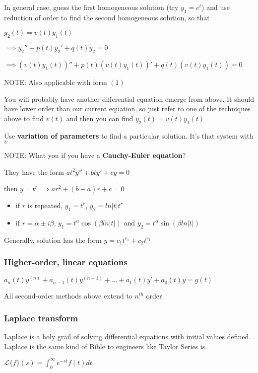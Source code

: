 \documentclass[12pt]{article}
\begin{document}
In general case, guess the first homogeneous solution (try \(y_1=e^t\)) and
use reduction of order to find the second homogeneous solution, so that

\(y_2(t) = v(t)y_1(t)\)

\(\implies y_2'' + p(t)y_2' + q(t)y_2 = 0\)

\(\implies (v(t)y_1(t))''+p(t)(v(t)y_1(t))'+q(t)(v(t)y_1(t))=0\)

NOTE: Also applicable with form \((1)\)

You will probably have another differential equation emerge from above. It
should have lower order than our current equation, so just refer to one of
the techniques above to find \(v(t)\) and then you can find
\(y_2(t)=v(t)y_1(t)\)

Use \textbf{variation of parameters} to find a particular solution. It's that
system with \(v\)

NOTE: What you if you have a \textbf{Cauchy-Euler equation}?

They have the form \(at^2y''+bty'+cy=0\)

then \(y=t^r \implies ar^2+(b-a)r+c=0\)

\begin{itemize}
\item if \(r\) is repeated, \(y_1=t^r\), \(y_2=ln|t|t^r\)
\item if \(r=\alpha\pm i\beta\), \(y_1=t^{\alpha}\cos(\beta ln|t|)\) and
\(y_2=t^{\alpha}\sin(\beta ln|t|)\)
\end{itemize}

Generally, solution has the form \(y=c_1t^{r_1}+c_2t^{r_2}\)

\subsubsection*{Higher-order, linear equations}
\label{sec:org57cd4c1}
\(a_n(t)y^{(n)}+a_{n-1}(t)y^{(n-1)}+\ldots+a_1(t)y'+a_0(t)y=g(t)\)

All second-order methods above extend to \(n^{th}\) order.

\subsubsection*{Laplace transform}
\label{sec:orgecfb79e}
Laplace is a holy grail of solving differential equations with initial
values defined. Laplace is the same kind of Bible to engineers like Taylor
Series is. 

\(\mathcal{L}\{f\}(s) = \int_0^{\infty} e^{-st} f(t) dt\)
\end{document}

